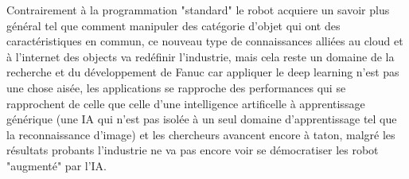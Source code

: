             Contrairement à la programmation "standard" le robot acquiere un savoir 
            plus général tel que comment manipuler des catégorie d'objet qui ont 
            des caractéristiques en commun, ce nouveau type de connaissances alliées au cloud 
            et à l'internet des objects va redéfinir l'industrie, mais cela reste un domaine 
            de la recherche et du développement de Fanuc car appliquer le deep learning 
            n'est pas une chose aisée, les applications se rapproche des performances qui se rapprochent 
            de celle que celle d'une intelligence artificelle à apprentissage générique (une 
            IA qui n'est pas isolée à un seul domaine d'apprentissage tel que la reconnaissance d'image)
            et les chercheurs avancent encore à taton, malgré les résultats probants 
            l'industrie ne va pas encore voir se démocratiser les robot "augmenté" par l'IA. \newline
            \newpage






